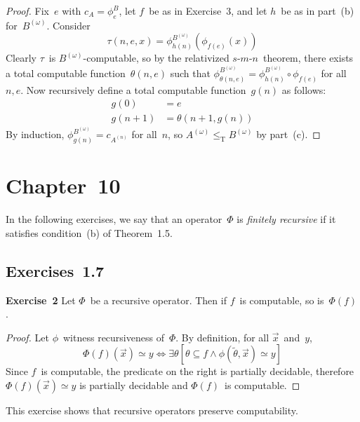 \documentclass[letterpaper]{article}
\newcommand{\exercise}[2][]{\noindent\textbf{Exercise~{#2}}\ifthenelse{\isempty{#1}}{\textbf{.}}{ ({#1})\textbf{.}}}
\newcommand{\tr}{\mathrel{\le_{\mathrm{T}}}}
\newcommand{\code}[1]{\widetilde{{#1}}}
\newcommand{\smn}{$s$-$m$-$n$}
\theoremstyle{plain}
\theoremstyle{definition}
\theoremstyle{remark}
\begin{document}
\begin{enumerate}[itemsep=0pt]
\begin{proof}
Fix~$e$ with $c_A=\phi_e^B$, let $f$~be as in Exercise~3, and let $h$~be as in part~(b) for~$B^{(\omega)}$. Consider
$$\tau(n,e,x)=\phi_{h(n)}^{B^{(\omega)}}(\phi_{f(e)}(x))$$
Clearly $\tau$~is $B^{(\omega)}$-computable, so by the relativized \smn\ theorem, there exists a total computable function~$\theta(n,e)$ such that $\phi_{\theta(n,e)}^{B^{(\omega)}}=\phi_{h(n)}^{B^{(\omega)}}\circ\phi_{f(e)}$ for all $n,e$. Now recursively define a total computable function~$g(n)$ as follows:
\begin{align*}
g(0)&=e\\
g(n+1)&=\theta(n+1,g(n))
\end{align*}
By induction, $\phi_{g(n)}^{B^{(\omega)}}=c_{A^{(n)}}$ for all~$n$, so $A^{(\omega)}\tr B^{(\omega)}$ by part~(c).
\end{proof}
\end{enumerate}

\section*{Chapter~10}
\noindent In the following exercises, we say that an operator~$\Phi$ is \emph{finitely recursive} if it satisfies condition~(b) of Theorem~1.5.

\subsection*{Exercises~1.7}
\exercise{2}
Let $\Phi$~be a recursive operator. Then if $f$~is computable, so is~$\Phi(f)$.
\begin{proof}
Let $\phi$~witness recursiveness of~$\Phi$. By definition, for all $\vec{x}$~and~$y$,
$$\Phi(f)(\vec{x})\simeq y\iff\exists\theta[\theta\subseteq f\land\phi(\code{\theta},\vec{x})\simeq y]$$
Since $f$~is computable, the predicate on the right is partially decidable, therefore $\Phi(f)(\vec{x})\simeq y$ is partially decidable and $\Phi(f)$~is computable.
\end{proof}
\noindent This exercise shows that recursive operators preserve computability.
\end{document}
